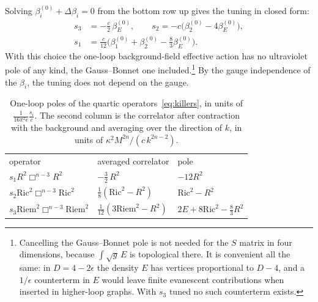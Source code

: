 \documentclass[aps,prd,10pt,twocolumn,superscriptaddress,nofootinbib,floatfix,longbibliography]{revtex4-2}
\newcommand{\Ric}{\mathrm{Ric}}
\newcommand{\Riem}{\mathrm{Riem}}
\begin{document}
Solving $\beta_i^{(0)}+\Delta\beta_i=0$ from the bottom row up gives the tuning in closed form:
\begin{equation}
\label{eq:tuning}
\begin{aligned}
s_3&=-\tfrac c2\,\beta_E^{(0)},\qquad s_2=-c\bigl(\beta_2^{(0)}-4\beta_E^{(0)}\bigr),\\
s_1&=\tfrac c{12}\bigl(\beta_1^{(0)}+\beta_2^{(0)}-\tfrac83\beta_E^{(0)}\bigr).
\end{aligned}
\end{equation}
With this choice the one-loop background-field effective action has no ultraviolet pole of any kind, the Gauss--Bonnet one included.\footnote{Cancelling the Gauss--Bonnet pole is not needed for the $S$ matrix in four dimensions, because $\int\sqrt g\,E$ is topological there. It is convenient all the same: in $D=4-2\epsilon$ the density $E$ has vertices proportional to $D-4$, and a $1/\epsilon$ counterterm in $E$ would leave finite evanescent contributions when inserted in higher-loop graphs. With $s_3$ tuned no such counterterm exists.} By the gauge independence of the $\beta_i$, the tuning does not depend on the gauge.

\begin{table}[t]
\caption{One-loop poles of the quartic operators~\eqref{eq:killers}, in units of $\frac{1}{16\pi^2\epsilon}\frac{s_i}{c}$. The second column is the correlator after contraction with the background and averaging over the direction of $k$, in units of $\kappa^2M^{2n}/(c\,k^{2n-2})$.}
\label{tab:killers}
\begin{ruledtabular}
\begin{tabular}{lll}
operator & averaged correlator & pole\\
\colrule
$s_1R^2\Box^{n-3}R^2$ & $-\frac32\,R^2$ & $-12R^2$\\
$s_2\Ric^2\Box^{n-3}\Ric^2$ & $\frac18(\Ric^2-R^2)$ & $\Ric^2-R^2$\\
$s_3\Riem^2\Box^{n-3}\Riem^2$ & $\frac1{12}(3\Riem^2-R^2)$ & $2E+8\Ric^2-\frac83R^2$\\
\end{tabular}
\end{ruledtabular}
\end{table}
\end{document}
